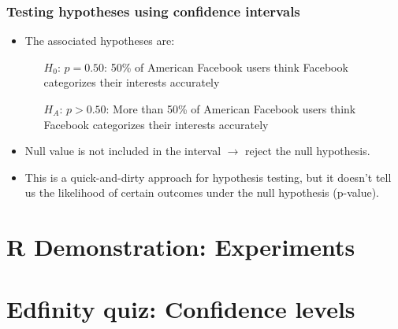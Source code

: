 \documentclass[t,compress,mathserif]{beamer}
\begin{document}

\begin{frame}
\frametitle{Testing hypotheses using confidence intervals}

{\small {}}

\pause

\begin{itemize}

\item The associated hypotheses are:
\begin{itemize}
\item[$H_0$:] $p = 0.50$: 50\% of American Facebook users think Facebook categorizes their interests accurately
\item[$H_A$:] $p > 0.50$: More than 50\% of American Facebook users think Facebook categorizes their interests accurately
\end{itemize}

\pause

\item Null value is not included in the interval $\rightarrow$ reject the null hypothesis.

\pause

\item This is a quick-and-dirty approach for hypothesis testing, but it doesn't tell us the likelihood of certain outcomes under the null hypothesis (p-value).

\end{itemize}

\end{frame}


\section{R Demonstration: Experiments}


\section{Edfinity quiz: Confidence levels}
\end{document}
